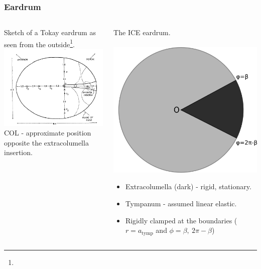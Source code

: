 \documentclass{beamer}
\let\oldfootnotesize\footnotesize
\renewcommand*{\footnotesize}{\oldfootnotesize\tiny}
\begin{document}
% 
% 

\begin{frame}
\frametitle{Eardrum}
\begin{columns}
    \begin{column}{0.5\textwidth}
      \centering
      \small
      Sketch of a Tokay eardrum as seen from the outside\footnote{}.\\
      \includegraphics[width = 3.7 cm]{Diagrams/geckoear.png}\\
      \footnotesize
     COL - approximate position opposite the extracolumella insertion.
    \end{column}

    \begin{column}{0.5\textwidth}
      \centering
      \small
      The ICE eardrum.\\
      \textbf{}\\
      \includegraphics[width = 3.2 cm]{Diagrams/tympanummodel.png}\\
\footnotesize
\begin{itemize}
      \item[] Extracolumella (dark) - rigid, stationary.
      \item[] Tympanum - assumed linear elastic.
      \item[] Rigidly clamped at the boundaries ($r=a_{\mathrm{tymp}}$ and $\phi=\beta,\ 2\pi-\beta$)
\end{itemize}

    \end{column}
  \end{columns}
  
\end{frame}
\end{document}

